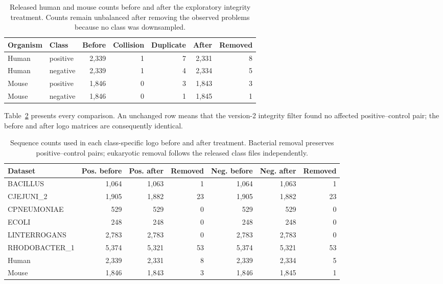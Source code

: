 \documentclass[11pt]{article}
\begin{document}
\begin{table}[H]
\centering
\caption{Released human and mouse counts before and after the exploratory integrity treatment. Counts remain unbalanced after removing the observed problems because no class was downsampled.}
\label{tab:euk-treatment}
\begin{tabular}{llrrrrr}
\toprule
Organism & Class & Before & Collision & Duplicate & After & Removed \\
\midrule
Human & positive & 2,339 & 1 & 7 & 2,331 & 8 \\
Human & negative & 2,339 & 1 & 4 & 2,334 & 5 \\
Mouse & positive & 1,846 & 0 & 3 & 1,843 & 3 \\
Mouse & negative & 1,846 & 0 & 1 & 1,845 & 1 \\
\bottomrule
\end{tabular}
\end{table}

Table~\ref{tab:all-counts} presents every comparison. An unchanged row means
that the version-2 integrity filter found no affected positive--control pair;
the before and after logo matrices are consequently identical.

\begin{table}[H]
\centering
\caption{Sequence counts used in each class-specific logo before and after treatment. Bacterial removal preserves positive--control pairs; eukaryotic removal follows the released class files independently.}
\label{tab:all-counts}
\small
\begin{tabular}{lrrrrrr}
\toprule
Dataset & Pos. before & Pos. after & Removed & Neg. before & Neg. after & Removed \\
\midrule
BACILLUS & 1,064 & 1,063 & 1 & 1,064 & 1,063 & 1 \\
CJEJUNI\_2 & 1,905 & 1,882 & 23 & 1,905 & 1,882 & 23 \\
CPNEUMONIAE & 529 & 529 & 0 & 529 & 529 & 0 \\
ECOLI & 248 & 248 & 0 & 248 & 248 & 0 \\
LINTERROGANS & 2,783 & 2,783 & 0 & 2,783 & 2,783 & 0 \\
RHODOBACTER\_1 & 5,374 & 5,321 & 53 & 5,374 & 5,321 & 53 \\
Human & 2,339 & 2,331 & 8 & 2,339 & 2,334 & 5 \\
Mouse & 1,846 & 1,843 & 3 & 1,846 & 1,845 & 1 \\
\bottomrule
\end{tabular}
\end{table}
\end{document}
